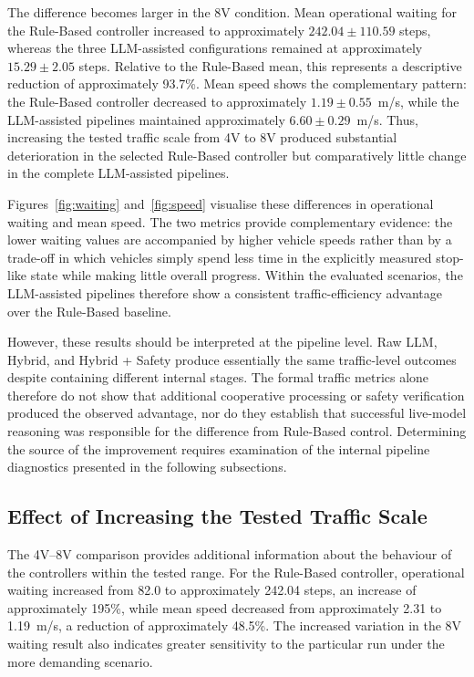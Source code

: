 \documentclass[letterpaper,10pt,conference]{ieeeconf}
\begin{document}
The difference becomes larger in the 8V condition. Mean operational waiting for the Rule-Based controller increased to approximately $242.04 \pm 110.59$ steps, whereas the three LLM-assisted configurations remained at approximately $15.29 \pm 2.05$ steps. Relative to the Rule-Based mean, this represents a descriptive reduction of approximately 93.7\%. Mean speed shows the complementary pattern: the Rule-Based controller decreased to approximately $1.19 \pm 0.55$~m/s, while the LLM-assisted pipelines maintained approximately $6.60 \pm 0.29$~m/s. Thus, increasing the tested traffic scale from 4V to 8V produced substantial deterioration in the selected Rule-Based controller but comparatively little change in the complete LLM-assisted pipelines.



Figures~\ref{fig:waiting} and~\ref{fig:speed} visualise these differences in operational waiting and mean speed. The two metrics provide complementary evidence: the lower waiting values are accompanied by higher vehicle speeds rather than by a trade-off in which vehicles simply spend less time in the explicitly measured stop-like state while making little overall progress. Within the evaluated scenarios, the LLM-assisted pipelines therefore show a consistent traffic-efficiency advantage over the Rule-Based baseline.



However, these results should be interpreted at the pipeline level. Raw LLM, Hybrid, and Hybrid + Safety produce essentially the same traffic-level outcomes despite containing different internal stages. The formal traffic metrics alone therefore do not show that additional cooperative processing or safety verification produced the observed advantage, nor do they establish that successful live-model reasoning was responsible for the difference from Rule-Based control. Determining the source of the improvement requires examination of the internal pipeline diagnostics presented in the following subsections.



\subsection{Effect of Increasing the Tested Traffic Scale}



The 4V--8V comparison provides additional information about the behaviour of the controllers within the tested range. For the Rule-Based controller, operational waiting increased from 82.0 to approximately 242.04 steps, an increase of approximately 195\%, while mean speed decreased from approximately 2.31 to 1.19~m/s, a reduction of approximately 48.5\%. The increased variation in the 8V waiting result also indicates greater sensitivity to the particular run under the more demanding scenario.
\end{document}
